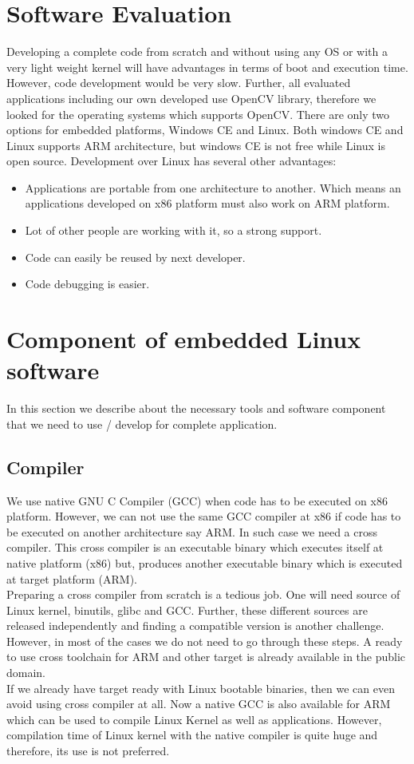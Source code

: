\section {Software Evaluation}
\indent Developing a complete code from scratch and without using any OS
or with a very light weight kernel will have advantages in terms of boot
and execution time. However, code development would be very slow. Further,
all evaluated applications including our own developed use
OpenCV library, therefore we looked for the operating systems which
supports OpenCV. There are only two options for embedded platforms,
Windows CE and Linux. Both windows CE and Linux supports ARM
architecture, but windows CE is not free while Linux is open source.
Development over Linux has several other advantages:
\begin{itemize}
	\item Applications are portable from one architecture to
		another. Which means an applications developed on x86
		platform must also work on ARM platform.
	\item Lot of other people are working with it, so a strong
		support.
	\item Code can easily be reused by next developer.
	\item Code debugging is easier.
\end{itemize}
\section {Component of embedded Linux software}
In this section we describe about the necessary tools and software
component that we need to use / develop for complete application.
\subsection {Compiler}
\indent We use native GNU C Compiler (GCC) when code has to be executed
on x86 platform. However, we can not use the same GCC compiler at x86 if
code has to be executed on another architecture say ARM. In such case we
need a cross compiler. This cross compiler is an executable binary which
executes itself at native platform (x86) but, produces another executable
binary which is executed at target platform (ARM).\\
\indent Preparing a cross compiler from scratch is a tedious job. One
will need source of Linux kernel, binutils, glibc and GCC. Further,
these different sources are released independently and finding a
compatible version is another challenge. However, in most of the cases
we do not need to go through these steps. A ready to use cross toolchain
for ARM and other target is already available in the public domain.\\
\indent If we already have target ready with Linux bootable binaries,
then we can even avoid using cross compiler at all. Now a native GCC is
also available for ARM which can be used to compile Linux Kernel as well
as applications. However, compilation time of Linux kernel with the
native compiler is quite huge and therefore, its use is not preferred.
